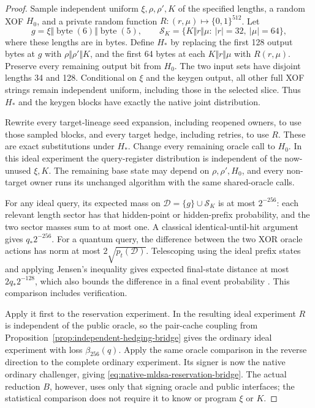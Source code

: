 \documentclass[pdflatex]{sn-jnl}
\theoremstyle{thmstyleone}
\theoremstyle{thmstylethree}
\theoremstyle{thmstyletwo}
\begin{document}
\begin{proof}
Sample independent uniform $\xi,\rho,\rho',K$ of the specified lengths,
a random XOF $H_0$, and a private random function
$R:(r,\mu)\mapsto\{0,1\}^{512}$. Let
\[
 g=\xi\Vert\operatorname{byte}(6)\Vert\operatorname{byte}(5),\qquad
 \mathcal S_K=\{K\Vert r\Vert\mu:\ |r|=32,\ |\mu|=64\},
\]
where these lengths are in bytes. Define $H_*$ by replacing the first
128 output bytes at $g$ with $\rho\Vert\rho'\Vert K$, and the first
64 bytes at each $K\Vert r\Vert\mu$ with $R(r,\mu)$. Preserve every
remaining output bit from $H_0$. The two input sets have disjoint lengths
34 and 128. Conditional on $\xi$ and the keygen output, all other full XOF strings
remain independent uniform, including those in the selected slice.
Thus $H_*$ and the keygen blocks have exactly the native joint distribution.

Rewrite every target-lineage seed expansion, including reopened owners,
to use those sampled blocks, and every target hedge, including retries,
to use $R$. These are exact substitutions under $H_*$. Change every
remaining oracle call to $H_0$. In this ideal experiment the query-register
distribution is independent of the now-unused $\xi,K$. The remaining
base state may depend on $\rho,\rho',H_0$, and every non-target owner
runs its unchanged algorithm with the same shared-oracle calls.

For any ideal query, its expected mass on
$\mathcal D=\{g\}\cup\mathcal S_K$ is at most $2^{-256}$: each relevant
length sector has that hidden-point or hidden-prefix probability, and the
two sector masses sum to at most one. A classical identical-until-hit
argument gives $q_*2^{-256}$. For a quantum query, the difference between
the two XOR oracle actions has norm at most $2\sqrt{p_t(\mathcal D)}$.
Telescoping using the ideal prefix states and applying Jensen's inequality
gives expected final-state distance at most $2q_*2^{-128}$, which also
bounds the difference in a final event probability
\cite{bennett1997strengths}. This comparison includes verification.

Apply it first to the reservation experiment. In the resulting ideal
experiment $R$ is independent of the public oracle, so the pair-cache
coupling from Proposition~\ref{prop:independent-hedging-bridge} gives the
ordinary ideal experiment with loss $\beta_{256}(q)$. Apply the same
oracle comparison in the reverse direction to the complete ordinary
experiment. Its signer is now the native ordinary challenger, giving
\eqref{eq:native-mldsa-reservation-bridge}. The actual reduction $B$, however,
uses only that signing oracle and public interfaces; the statistical comparison
does not require it to know or program $\xi$ or $K$.
\end{proof}
\end{document}
